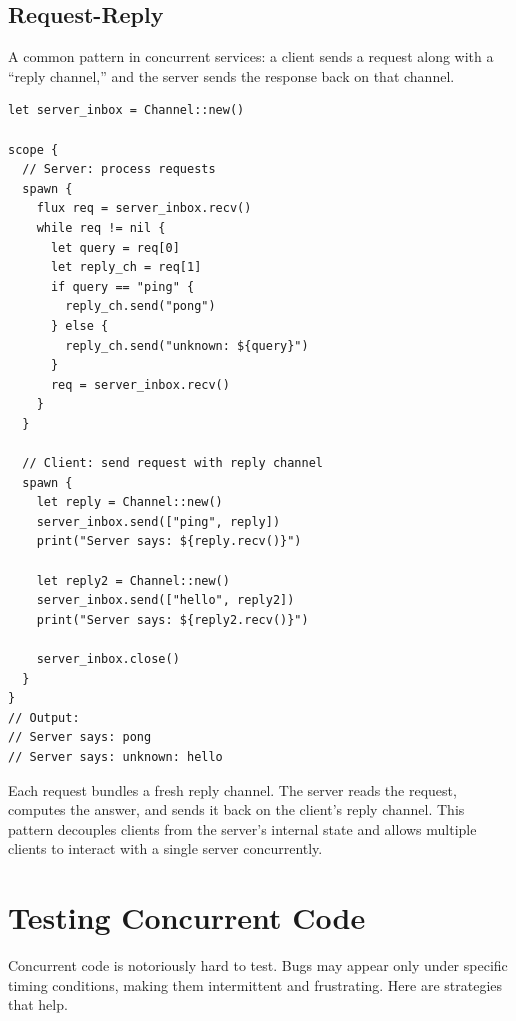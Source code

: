 \subsection{Request-Reply}\label{subsec:request-reply}


A common pattern in concurrent services: a client sends a request along with a ``reply channel,'' and the server sends the response back on that channel.

\begin{lstlisting}[language=Lattice, caption={Request-reply pattern}]
let server_inbox = Channel::new()

scope {
  // Server: process requests
  spawn {
    flux req = server_inbox.recv()
    while req != nil {
      let query = req[0]
      let reply_ch = req[1]
      if query == "ping" {
        reply_ch.send("pong")
      } else {
        reply_ch.send("unknown: ${query}")
      }
      req = server_inbox.recv()
    }
  }

  // Client: send request with reply channel
  spawn {
    let reply = Channel::new()
    server_inbox.send(["ping", reply])
    print("Server says: ${reply.recv()}")

    let reply2 = Channel::new()
    server_inbox.send(["hello", reply2])
    print("Server says: ${reply2.recv()}")

    server_inbox.close()
  }
}
// Output:
// Server says: pong
// Server says: unknown: hello
\end{lstlisting}

Each request bundles a fresh reply channel.
The server reads the request, computes the answer, and sends it back on the client's reply channel.
This pattern decouples clients from the server's internal state and allows multiple clients to interact with a single server concurrently.

\section{Testing Concurrent Code}\label{sec:testing-concurrent-code}


Concurrent code is notoriously hard to test.
Bugs may appear only under specific timing conditions, making them intermittent and frustrating.
Here are strategies that help.

